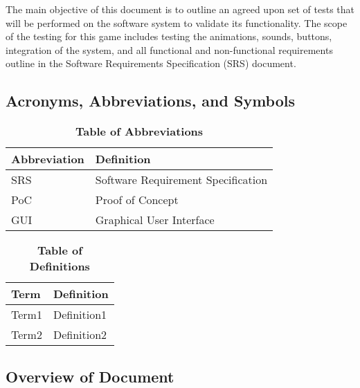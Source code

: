 \documentclass[12pt, titlepage]{article}
\begin{document}
\par The main objective of this document is to outline an agreed upon set of tests that will be performed on the software system to validate its functionality. The scope of the testing for this game includes testing the animations, sounds, buttons, integration of the system, and all functional and non-functional requirements outline in the Software Requirements Specification (SRS) document.


\subsection{Acronyms, Abbreviations, and Symbols}
	
\begin{table}[hbp]
\caption{\textbf{Table of Abbreviations}} \label{Table}
\begin{tabularx}{\textwidth}{p{3cm}X}
\toprule
\textbf{Abbreviation} & \textbf{Definition} \\
\midrule
SRS & Software Requirement Specification\\
PoC & Proof of Concept\\
GUI & Graphical User Interface\\
\bottomrule
\end{tabularx}
\end{table}


\begin{table}[!htbp]
\caption{\textbf{Table of Definitions}} \label{Table}
\begin{tabularx}{\textwidth}{p{3cm}X}
\toprule
\textbf{Term} & \textbf{Definition}\\
\midrule
Term1 & Definition1\\
Term2 & Definition2\\
\bottomrule
\end{tabularx}
\end{table}	
\subsection{Overview of Document}
\end{document}

